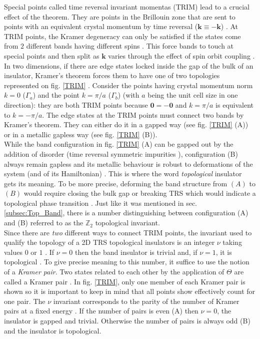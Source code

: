 Special points called time reversal invariant momentas (TRIM) lead to a crucial effect of the theorem. They are points in the Brillouin zone that are sent to points with an equivalent crystal momentum by time reversal ($\mathbf{k} \equiv -\mathbf{k}$) \cite{kruthoff_topology_2019}. At TRIM points, the Kramer degeneracy can only be satisfied if the states come from $2$ different bands having different spins \cite{kruthoff_topology_2019}. This force bands to touch at special points and then split as $\mathbf{k}$ varies through the effect of spin orbit coupling \cite{kane_topological_2013}. In two dimensions, if there are edge states locked inside the gap of the bulk of an insulator, Kramer's theorem forces them to have one of two topologies represented on fig. \ref{TRIM} \cite{kane_topological_2013}. Consider the points having crystal momentum norm $k = 0$ ($\Gamma_a$) and the point $k = \pi/a$ ($\Gamma_b$) (with $a$ being the unit cell size in one direction): they are both TRIM points because $\mathbf{0} = - \mathbf{0}$ and $k = \pi/a$ is equivalent to $k = -\pi/a$. The edge states at the TRIM points must connect two bands by Kramer's theorem. They can either do it in a gapped way (see fig. \ref{TRIM} (A)) or in a metallic gapless way (see fig. \ref{TRIM} (B)).\\

While the band configuration in fig. \ref{TRIM} (A) can be gapped out by the addition of disorder (time reversal symmetric impurities \cite{asboth_short_2016}), configuration (B) always remain gapless and its metallic behaviour is robust to deformations of the system (and of its Hamiltonian) \cite{cayssol_topological_2021}. This is where the word \textit{topological} insulator gets its meaning. To be more precise, deforming the band structure from $(A)$ to $(B)$ would require closing the bulk gap or breaking TRS which would indicate a topological phase transition \cite{cayssol_topological_2021}. Just like it was mentioned in sec. \ref{subsec:Top_Band}, there is a number distinguishing between configuration (A) and (B) referred to as the $\mathbb{Z}_2$ topological invariant.\\

Since there are \textit{two} different ways to connect TRIM points, the invariant used to qualify the topology of a 2D TRS topological insulators is an integer $\nu$ taking values $0$ or $1$ \cite{bernevig_topological_2013}. If $\nu = 0$ then the band insulator is trivial and, if $\nu = 1$, it is topological \cite{cayssol_topological_2021}. To give precise meaning to this number, it suffice to use the notion of a \textit{Kramer pair}. Two states related to each other by the application of $\Theta$ are called a Kramer pair \cite{asboth_short_2016}. In fig. \ref{TRIM}, only one member of each Kramer pair is shown so it is important to keep in mind that all points show effectively count for one pair. The $\nu$ invariant corresponds to the parity of the number of Kramer pairs at a fixed energy \cite{asboth_short_2016}. If the number of pairs is even (A) then $\nu = 0$, the insulator is gapped and trivial. Otherwise the number of pairs is always odd (B) and the insulator is topological.

